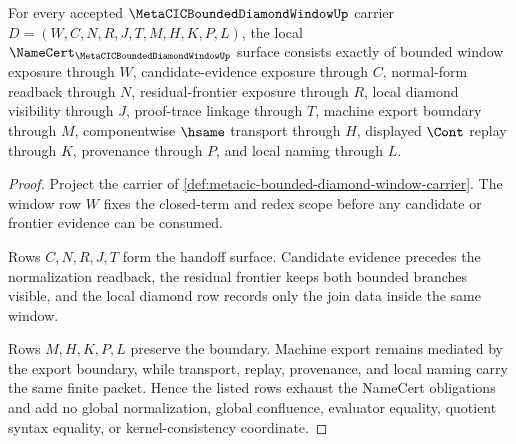 \begin{theorem}
\label{thm:metacic-bounded-diamond-window-namecert-obligations}
For every accepted $\MetaCICBoundedDiamondWindowUp$ carrier $D=(W,C,N,R,J,T,M,H,K,P,L)$, the local $\NameCert_{\MetaCICBoundedDiamondWindowUp}$ surface consists exactly of bounded window exposure through $W$, candidate-evidence exposure through $C$, normal-form readback through $N$, residual-frontier exposure through $R$, local diamond visibility through $J$, proof-trace linkage through $T$, machine export boundary through $M$, componentwise $\hsame$ transport through $H$, displayed $\Cont$ replay through $K$, provenance through $P$, and local naming through $L$.
\end{theorem}
\begin{proof}
Project the carrier of \autoref{def:metacic-bounded-diamond-window-carrier}. The window row $W$ fixes the closed-term and redex scope before any candidate or frontier evidence can be consumed.

Rows $C,N,R,J,T$ form the handoff surface. Candidate evidence precedes the normalization readback, the residual frontier keeps both bounded branches visible, and the local diamond row records only the join data inside the same window.

Rows $M,H,K,P,L$ preserve the boundary. Machine export remains mediated by the export boundary, while transport, replay, provenance, and local naming carry the same finite packet. Hence the listed rows exhaust the NameCert obligations and add no global normalization, global confluence, evaluator equality, quotient syntax equality, or kernel-consistency coordinate.
\end{proof}

